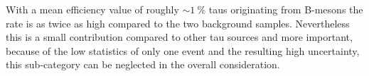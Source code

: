 %
With a mean efficiency value of roughly $\sim\SI{1}{\percent}$ taus originating from B-mesons the rate is as twice as high compared to the two background samples. Nevertheless this is a small contribution compared to other tau sources and more important, because of the low statistics of only one event and the resulting high uncertainty, this sub-category can be neglected in the overall consideration.\par  
